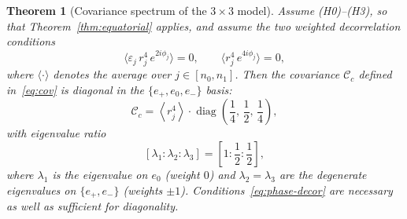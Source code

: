 \documentclass[11pt,a4paper]{article}
\newtheorem{theorem}{Theorem}[section]
\begin{document}
  \begin{theorem}[Covariance spectrum of the $3\times3$ model]
    \label{thm:spectrum}
    Assume (H0)--(H3), so that Theorem~\ref{thm:equatorial} applies, and assume the two
    \emph{weighted} decorrelation conditions
    \begin{equation}
      \label{eq:phase-decor}
      \bigl\langle \varepsilon_j\, r_j^4\, e^{2i\phi_j} \bigr\rangle = 0 ,
      \qquad
      \bigl\langle r_j^4\, e^{4i\phi_j} \bigr\rangle = 0 ,
    \end{equation}
    where $\langle \cdot \rangle$ denotes the average over $j \in [n_0, n_1]$.
    Then the covariance $\mathcal{C}_c$ defined in~\eqref{eq:cov} is diagonal in the
    $\{e_+, e_0, e_-\}$ basis:
    \begin{equation}
      \label{eq:cov-diag}
      \mathcal{C}_c = \left\langle r_j^4 \right\rangle \cdot
      \operatorname{diag}\!\left(\frac{1}{4},\, \frac{1}{2},\, \frac{1}{4}\right),
    \end{equation}
    with eigenvalue ratio
    \begin{equation}
      \label{eq:ratio}
      [\lambda_1 : \lambda_2 : \lambda_3]
      = \left[1 : \frac{1}{2} : \frac{1}{2}\right],
    \end{equation}
    where $\lambda_1$ is the eigenvalue on $e_0$ (weight $0$) and
    $\lambda_2 = \lambda_3$ are the degenerate eigenvalues on $\{e_+, e_-\}$ (weights $\pm 1$).
    Conditions~\eqref{eq:phase-decor} are necessary as well as sufficient for
    diagonality.
  \end{theorem}
\end{document}
